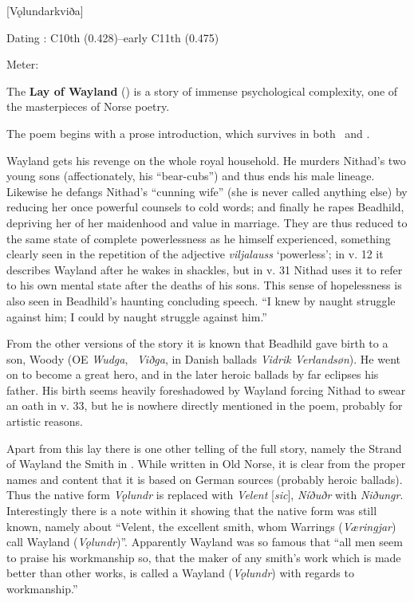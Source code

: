 [Vǫlundarkviða]

\begin{flushright}%
Dating \parencite{Sapp2022}: C10th (0.428)–early C11th (0.475)

Meter: \Fornyrdislag%
\end{flushright}%


The \textbf{Lay of Wayland} (\Volundarkvida) is a story of immense psychological complexity, one of the masterpieces of Norse poetry.

The poem begins with a prose introduction, which survives in both \Regius\ and \AM.

Wayland gets his revenge on the whole royal household. He murders Nithad’s two young sons (affectionately, his “bear-cubs”) and thus ends his male lineage. Likewise he defangs Nithad’s “cunning wife” (she is never called anything else) by reducing her once powerful counsels to cold words; and finally he rapes Beadhild, depriving her of her maidenhood and value in marriage. They are thus reduced to the same state of complete powerlessness as he himself experienced, something clearly seen in the repetition of the adjective \emph{viljalauss} ‘powerless’; in v. 12 it describes Wayland after he wakes in shackles, but in v. 31 Nithad uses it to refer to his own mental state after the deaths of his sons. This sense of hopelessness is also seen in Beadhild’s haunting concluding speech. “I knew by naught struggle against him; I could by naught struggle against him.”

From the other versions of the story it is known that Beadhild gave birth to a son, Woody (OE \emph{Wudga}, \ThidreksSaga\ \emph{Viðga}, in Danish ballads \emph{Vidrik Verlandsøn}). He went on to become a great hero, and in the later heroic ballads by far eclipses his father. His birth seems heavily foreshadowed by Wayland forcing Nithad to swear an oath in v. 33, but he is nowhere directly mentioned in the poem, probably for artistic reasons.

Apart from this lay there is one other telling of the full story, namely the Strand of Wayland the Smith in \ThidreksSaga. While written in Old Norse, it is clear from the proper names and content that it is based on German sources (probably heroic ballads). Thus the native form \emph{Vǫlundr} is replaced with \emph{Velent} [\emph{sic}], \emph{Níðuðr} with \emph{Niðungr}. Interestingly there is a note within it showing that the native form was still known, namely about “Velent, the excellent smith, whom Warrings (\emph{Væringjar}) call Wayland (\emph{Vǫlundr})”. Apparently Wayland was so famous that “all men seem to praise his workmanship so, that the maker of any smith’s work which is made better than other works, is called a Wayland (\emph{Vǫlundr}) with regards to workmanship.”

